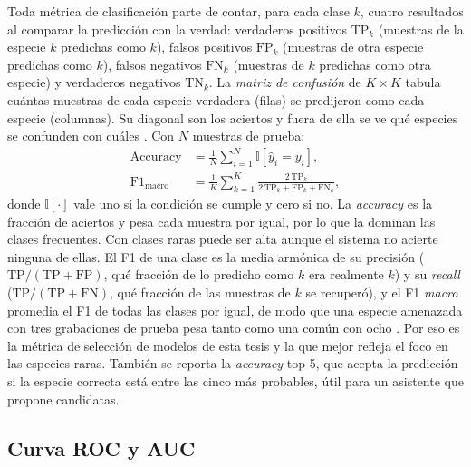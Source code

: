 Toda métrica de clasificación parte de contar, para cada clase $k$, cuatro
resultados al comparar la predicción con la verdad: verdaderos positivos
$\mathrm{TP}_k$ (muestras de la especie $k$ predichas como $k$), falsos
positivos $\mathrm{FP}_k$ (muestras de otra especie predichas como $k$),
falsos negativos $\mathrm{FN}_k$ (muestras de $k$ predichas como otra
especie) y verdaderos negativos $\mathrm{TN}_k$. La \emph{matriz de
confusión} de $K \times K$ tabula cuántas muestras de cada especie
verdadera (filas) se predijeron como cada especie (columnas). Su diagonal
son los aciertos y fuera de ella se ve qué especies se confunden con cuáles
\citep[pp.~147--148]{bishop2024deep}. Con $N$ muestras de prueba:
\begin{align}
  \mathrm{Accuracy} &= \frac{1}{N}\sum_{i=1}^{N} \mathbb{I}[\hat{y}_i = y_i], \label{eq:acc} \\
  \mathrm{F1}_{\mathrm{macro}} &= \frac{1}{K}\sum_{k=1}^{K}
    \frac{2\,\mathrm{TP}_k}{2\,\mathrm{TP}_k + \mathrm{FP}_k + \mathrm{FN}_k}, \label{eq:f1}
\end{align}
donde $\mathbb{I}[\cdot]$ vale uno si la condición se cumple y cero si no. La
\textit{accuracy} es la fracción de aciertos y pesa cada muestra por igual,
por lo que la dominan las clases frecuentes. Con clases raras puede ser alta
aunque el sistema no acierte ninguna de ellas. El F1 de una clase es la
media armónica de
su precisión ($\mathrm{TP}/(\mathrm{TP}+\mathrm{FP})$, qué fracción de lo
predicho como $k$ era realmente $k$) y su \textit{recall}
($\mathrm{TP}/(\mathrm{TP}+\mathrm{FN})$, qué fracción de las muestras de $k$
se recuperó), y el F1 \emph{macro} promedia el F1 de todas las clases por
igual, de modo que una especie amenazada con tres grabaciones de prueba pesa
tanto como una común con ocho \citep[pp.~170--171]{virtanen2018casse}. Por
eso es la métrica de selección de modelos de esta tesis y la que mejor
refleja el foco en las especies raras. También se reporta la
\textit{accuracy} top-5, que acepta la predicción si la especie correcta
está entre las cinco más probables, útil para un asistente que propone
candidatas.

\subsection{Curva ROC y AUC}

